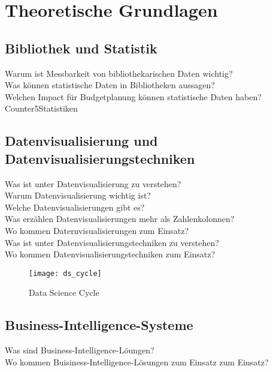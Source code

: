 \chapter{Theoretische Grundlagen}
\label{chap:two}
\section{Bibliothek und Statistik}
\label{chap:two_one}
Warum ist Messbarkeit von bibliothekarischen Daten wichtig?\\
Was können statistische Daten in Bibliotheken aussagen?\\
Welchen Impact für Budgetplanung können statistische Daten haben?\\

Counter5Statistiken
\section{Datenvisualisierung und Datenvisualisierungstechniken}
Was ist unter Datenvisualisierung zu verstehen?\\
Warum Datenvisualisierung wichtig ist?\\
Welche Datenvisualisierungen gibt es?\\
Was erzählen Datenvisualisierungen mehr als Zahlenkolonnen?\\
Wo kommen Daternvisualisierungen zum Einsatz?\\
Was ist unter Datenvisualisierungstechniken zu verstehen?\\
Wo kommen Datenvisualisierungstechniken zum Einsatz?


\begin{figure}[ht]
    \centering
        \texttt{[image: ds\_cycle]}
        \caption{Data Science Cycle}
        \label{fig:data science}
\end{figure}




\section{Business-Intelligence-Systeme}

Was sind Business-Intelligence-Löungen?\\
Wo kommen Buisiness-Intelligence-Lösungen zum Einsatz zum Einsatz?
